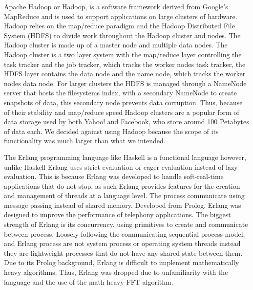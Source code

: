 \documentclass[conference,12pt]{IEEEtran}
\begin{document}
		Apache Hadoop or Hadoop, is a software framework derived from Google's MapReduce and is used to support applications on large clusters of hardware.  Hadoop relies on the map/reduce paradigm and the Hadoop Distributed File System (HDFS) to divide work throughout
		the Hadoop cluster and nodes.  The Hadoop cluster is made up of a master node and multiple data nodes.  The Hadoop cluster is a two layer system with the map/reduce layer controlling the task tracker and the job tracker, which tracks the worker nodes task tracker,
		the HDFS layer contains the data node and the name node, which tracks the worker nodes data node.  For larger clusters the HDFS is managed through a NameNode server that hosts the filesystems index, with a secondary NameNode to create snapshots of data, this 
		secondary node prevents data corruption.  Thus, because of their stability and map/reduce speed Hadoop clusters are a popular form of data storage used by both Yahoo! and Facebook, who store around 100 Petabytes of data each.  We decided against using Hadoop 
		because the scope of its functionality was much larger than what we intended. 

		The Erlang programming language like Haskell is a functional language however, unlike Haskell Erlang uses strict evaluation or eager evaluation instead of lazy evaluation.  This is because Erlang was developed to handle soft-real-time applications that do not stop,
		as such Erlang provides features for the creation and management of threads at a language level.  The process communicate using message passing instead of shared memory.  Developed from Prolog, Erlang was designed to improve the performance of telephony applications. 
		The biggest strength of Erlang is its concurrency, using primitives to create and communicate between process.  Loosely following the communicating sequential process model, and Erlang process are not system process or operating system threads instead they are 
		lightweight processes that do not have any shared state between them.  Due to its Prolog background, Erlang is difficult to implement mathematically heavy algorithms.  Thus, Erlang was dropped due to unfamiliarity with the language and the use of the math heavy FFT 
		algorithm.
\end{document}
